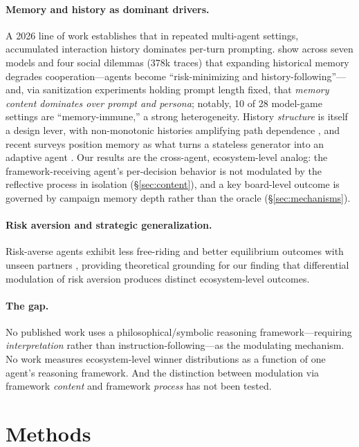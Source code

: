 \documentclass[11pt]{article}
\begin{document}
\paragraph{Memory and history as dominant drivers.}
A 2026 line of work establishes that in repeated multi-agent settings, accumulated interaction history dominates per-turn prompting. \citet{MemoryCurse2026} show across seven models and four social dilemmas (378k traces) that expanding historical memory degrades cooperation---agents become ``risk-minimizing and history-following''---and, via sanitization experiments holding prompt length fixed, that \emph{memory content dominates over prompt and persona}; notably, 10 of 28 model-game settings are ``memory-immune,'' a strong heterogeneity. History \emph{structure} is itself a design lever, with non-monotonic histories amplifying path dependence \citep{NetworkHistory2025}, and recent surveys position memory as what turns a stateless generator into an adaptive agent \citep{MemorySurvey2026}. Our results are the cross-agent, ecosystem-level analog: the framework-receiving agent's per-decision behavior is not modulated by the reflective process in isolation (\S\ref{sec:content}), and a key board-level outcome is governed by campaign memory depth rather than the oracle (\S\ref{sec:mechanisms}).

\paragraph{Risk aversion and strategic generalization.}
Risk-averse agents exhibit less free-riding and better equilibrium outcomes with unseen partners \citep{Qu2026riskaversion}, providing theoretical grounding for our finding that differential modulation of risk aversion produces distinct ecosystem-level outcomes.

\paragraph{The gap.}
No published work uses a philosophical/symbolic reasoning framework---requiring \emph{interpretation} rather than instruction-following---as the modulating mechanism. No work measures ecosystem-level winner distributions as a function of one agent's reasoning framework. And the distinction between modulation via framework \emph{content} and framework \emph{process} has not been tested.


\section{Methods}
\label{sec:methods}
\end{document}
